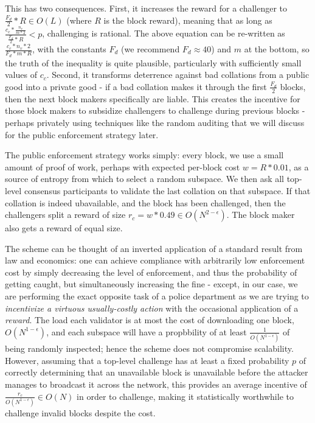 \documentclass[11pt,a4paper]{article}
\theoremstyle{plain}
\theoremstyle{definition}
\theoremstyle{remark}
\begin{document}
This has two consequences. First, it increases the reward for a challenger to $\frac{F_d}{2} * R \in O(L)$ (where $R$ is the block reward), meaning that as long as $\frac{c_c * \frac{n_v}{m * 2}}{\frac{F_d}{2} * R} < p$, challenging is rational. The above equation can be re-written as $\frac{c_c * n_v * 2}{F_d * m * R}$, with the constants $F_d$ (we recommend $F_d \approx 40$) and $m$ at the bottom, so the truth of the inequality is quite plausible, particularly with sufficiently small values of $c_c$. Second, it transforms deterrence against bad collations from a public good into a private good - if a bad collation makes it through the first $\frac{F_d}{2}$ blocks, then the next block makers specifically are liable. This creates the incentive for those block makers to subsidize challengers to challenge during previous blocks - perhaps privately using techniques like the random auditing that we will discuss for the public enforcement strategy later.

The public enforcement strategy works simply: every block, we use a small amount of proof of work, perhaps with expected per-block cost $w = R * 0.01$, as a source of entropy from which to select a random subspace. We then ask all top-level consensus participants to validate the last collation on that subspace. If that collation is indeed ubavailable, and the block has been challenged, then the challengers split a reward of size $r_c = w * 0.49 \in O(N^{2-\epsilon})$. The block maker also gets a reward of equal size.

The scheme can be thought of an inverted application of a standard result from law and economics: one can achieve compliance with arbitrarily low enforcement cost by simply decreasing the level of enforcement, and thus the probability of getting caught, but simultaneously increasing the fine\cite{econofcrime} - except, in our case, we are performing the exact opposite task of a police department as we are trying to \emph{incentivize a virtuous usually-costly action} with the occasional application of a \emph{reward}. The load each validator is at most the cost of downloading one block, $O(N^{1-\epsilon})$, and each subspace will have a propbbility of at least $\frac{1}{O(N^{1-\epsilon})}$ of being randomly inspected; hence the scheme does not compromise scalability. However, assuming that a top-level challenge has at least a fixed probability $p$ of correctly determining that an unavailable block is unavailable before the attacker manages to broadcast it across the network, this provides an average incentive of $\frac{r_c}{O(N^{1-\epsilon})} \in O(N)$ in order to challenge, making it statistically worthwhile to challenge invalid blocks despite the cost.
\end{document}
